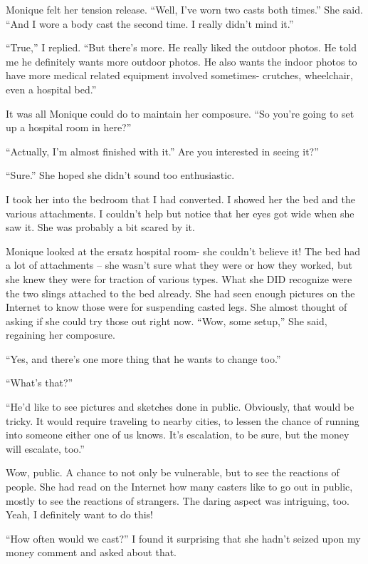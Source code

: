 Monique felt her tension release. ``Well, I've worn two casts both times.'' She said. ``And
I wore a body cast the second time. I really didn't mind it.''

``True,'' I replied. ``But there's more. He really liked the outdoor photos. He told me he
definitely wants more outdoor photos. He also wants the indoor photos to have more medical
related equipment involved sometimes- crutches, wheelchair, even a hospital bed.''

It was all Monique could do to maintain her composure. ``So you're going to set up a
hospital room in here?''

``Actually, I'm almost finished with it.'' Are you interested in seeing it?''

``Sure.'' She hoped she didn't sound too enthusiastic.

I took her into the bedroom that I had converted. I showed her the bed and the various
attachments. I couldn't help but notice that her eyes got wide when she saw it. She was probably
a bit scared by it.

Monique looked at the ersatz hospital room- she couldn't believe it! The bed had a lot of
attachments – she wasn't sure what they were or how they worked, but she knew they were for
traction of various types. What she DID recognize were the two slings attached to the bed
already. She had seen enough pictures on the Internet to know those were for suspending casted
legs. She almost thought of asking if she could try those out right now.
``Wow, some setup,'' She said, regaining her composure.

``Yes, and there's one more thing that he wants to change too.''

``What's that?'' 

``He'd like to see pictures and sketches done in public. Obviously, that would be tricky. It
would require traveling to nearby cities, to lessen the chance of running into someone either
one of us knows. It's escalation, to be sure, but the money will escalate, too.''

\begin{thought}
Wow, public. A chance to not only be vulnerable, but to see the reactions of people. She had
read on the Internet how many casters like to go out in public, mostly to see the reactions of
strangers. The daring aspect was intriguing, too. Yeah, I definitely want to do this!
\end{thought}

``How often would we cast?'' I found it surprising that she hadn't seized upon my money
comment and asked about that.

